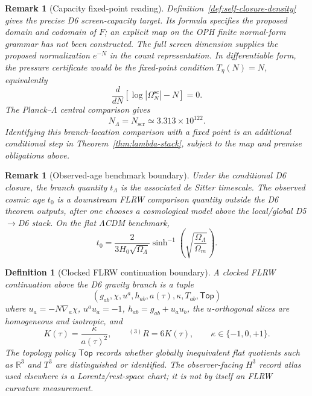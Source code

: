 \documentclass[11pt]{article}
\newtheorem{definition}[theorem]{Definition}
\newtheorem{remark}[theorem]{Remark}
\begin{document}
\begin{remark}[Capacity fixed-point reading]\label{rem:self-closure-counting-target}
Definition~\ref{def:self-closure-density} gives the precise D6 screen-capacity target. Its formula
specifies the proposed domain and codomain of \(F\); an explicit map on the OPH finite normal-form
grammar has not been constructed. The full screen dimension supplies the proposed normalization
\(e^{-N}\) in the count representation. In differentiable form, the pressure certificate would be
the fixed-point condition \(T_\eta(N)=N\), equivalently
\[
\frac{d}{dN}\left[\log|\Omega^{\mathrm{sc}}_N|-N\right]=0.
\]
The Planck--\(\Lambda\) central comparison gives
\[
N_{\Lambda}=N_{\mathrm{scr}}\simeq3.313\times10^{122}.
\]
Identifying this branch-location comparison with a fixed point is an additional conditional step in
Theorem~\ref{thm:lambda-stack}, subject to the map and premise obligations above.
\end{remark}

\begin{remark}[Observed-age benchmark boundary]\label{rem:lambda-age}
Under the conditional D6 closure, the branch quantity \(t_\Lambda\) is the associated de Sitter
timescale. The observed cosmic age \(t_0\) is a downstream FLRW comparison quantity outside the D6
theorem outputs, after one chooses a cosmological model above the local/global D5\(\to\)D6 stack. On
the flat \(\Lambda\)CDM benchmark,
\[
t_0=\frac{2}{3H_0\sqrt{\Omega_\Lambda}}
\sinh^{-1}\!\left(\sqrt{\frac{\Omega_\Lambda}{\Omega_m}}\right).
\]
\end{remark}

\begin{definition}[Clocked FLRW continuation boundary]\label{def:clocked-flrw-boundary}
A clocked FLRW continuation above the D6 gravity branch is a tuple
\[
(g_{ab},\chi,u^a,h_{ab},a(\tau),\kappa,T_{ab},\mathsf{Top})
\]
where \(u_a=-N\nabla_a\chi\), \(u^au_a=-1\), \(h_{ab}=g_{ab}+u_au_b\), the \(u\)-orthogonal
slices are homogeneous and isotropic, and
\[
K(\tau)=\frac{\kappa}{a(\tau)^2},\qquad {}^{(3)}R=6K(\tau),\qquad \kappa\in\{-1,0,+1\}.
\]
The topology policy \(\mathsf{Top}\) records whether globally inequivalent flat quotients such as
\(\mathbb R^3\) and \(T^3\) are distinguished or identified. The observer-facing \(H^3\) record
atlas used elsewhere is a Lorentz/rest-space chart; it is not by itself an FLRW curvature
measurement.
\end{definition}
\end{document}

